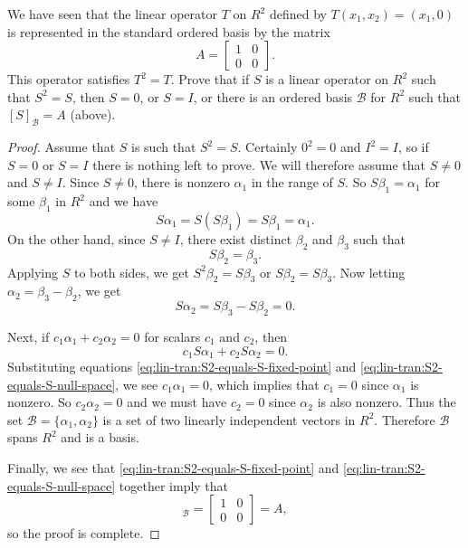 We have seen that the linear operator $T$ on $R^2$
defined by $T(x_1,x_2) = (x_1,0)$ is represented in the standard
ordered basis by the matrix
\begin{equation*}
  A =
  \begin{bmatrix}
    1 & 0 \\
    0 & 0
  \end{bmatrix}.
\end{equation*}
This operator satisfies $T^2 = T$. Prove that if $S$ is a linear
operator on $R^2$ such that $S^2 = S$, then $S = 0$, or $S = I$, or
there is an ordered basis $\mathcal{B}$ for $R^2$ such that
$[S]_{\mathcal{B}} = A$ (above).
\begin{proof}
  Assume that $S$ is such that $S^2 = S$. Certainly $0^2 = 0$ and
  $I^2 = I$, so if $S = 0$ or $S = I$ there is nothing left to
  prove. We will therefore assume that $S\neq0$ and $S\neq I$. Since
  $S\neq0$, there is nonzero $\alpha_1$ in the range of $S$. So
  $S\beta_1 = \alpha_1$ for some $\beta_1$ in $R^2$ and we have
  \begin{equation}
    \label{eq:lin-tran:S2-equals-S-fixed-point}
    S\alpha_1 = S(S\beta_1) = S\beta_1 = \alpha_1.
  \end{equation}
  On the other hand, since $S\neq I$, there exist distinct $\beta_2$
  and $\beta_3$ such that
  \begin{equation*}
    S\beta_2 = \beta_3.
  \end{equation*}
  Applying $S$ to both sides, we get $S^2\beta_2 = S\beta_3$ or
  $S\beta_2 = S\beta_3$. Now letting $\alpha_2 = \beta_3 - \beta_2$,
  we get
  \begin{equation}
    \label{eq:lin-tran:S2-equals-S-null-space}
    S\alpha_2 = S\beta_3 - S\beta_2 = 0.
  \end{equation}

  Next, if $c_1\alpha_1 + c_2\alpha_2 = 0$ for scalars $c_1$ and
  $c_2$, then
  \begin{equation*}
    c_1S\alpha_1 + c_2S\alpha_2 = 0.
  \end{equation*}
  Substituting equations \eqref{eq:lin-tran:S2-equals-S-fixed-point}
  and \eqref{eq:lin-tran:S2-equals-S-null-space}, we see
  $c_1\alpha_1 = 0$, which implies that $c_1 = 0$ since $\alpha_1$ is
  nonzero. So $c_2\alpha_2 = 0$ and we must have $c_2 = 0$ since
  $\alpha_2$ is also nonzero. Thus the set
  $\mathcal{B} = \{\alpha_1,\alpha_2\}$ is a set of two linearly
  independent vectors in $R^2$. Therefore $\mathcal{B}$ spans $R^2$
  and is a basis.

  Finally, we see that \eqref{eq:lin-tran:S2-equals-S-fixed-point} and
  \eqref{eq:lin-tran:S2-equals-S-null-space} together imply that
  \begin{equation*}
    [S]_{\mathcal{B}} =
    \begin{bmatrix}
      1 & 0 \\
      0 & 0
    \end{bmatrix}
    = A,
  \end{equation*}
  so the proof is complete.
\end{proof}

